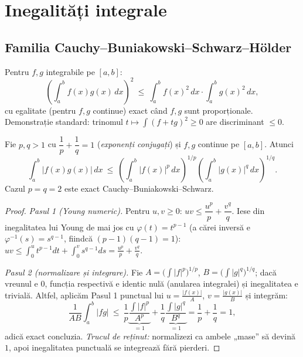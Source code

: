 \section{Inegalități integrale}

\subsection{Familia Cauchy--Buniakowski--Schwarz--Hölder}

\begin{teorema}
Pentru $f,g$ integrabile pe $[a,b]$:
\[
\left(\int_a^b f(x)g(x)\,dx\right)^{2}\ \le\ \int_a^b f(x)^2\,dx\cdot\int_a^b g(x)^2\,dx,
\]
cu egalitate (pentru $f,g$ continue) exact când $f,g$ sunt proporționale. Demonstrație standard: trinomul $t\mapsto\int(f+tg)^2\ge0$ are discriminant $\le0$.
\end{teorema}

\begin{teorema}
Fie $p,q>1$ cu $\dfrac1p+\dfrac1q=1$ (\emph{exponenți conjugați}) și $f,g$ continue pe $[a,b]$. Atunci
\[
\int_a^b|f(x)g(x)|\,dx\ \le\ \left(\int_a^b|f(x)|^p\,dx\right)^{1/p}\left(\int_a^b|g(x)|^q\,dx\right)^{1/q}.
\]
Cazul $p=q=2$ este exact Cauchy--Buniakowski--Schwarz.
\end{teorema}
\begin{proof}
\emph{Pasul 1 (Young numeric).} Pentru $u,v\ge0$: $uv\le\dfrac{u^p}{p}+\dfrac{v^q}{q}$. Iese din inegalitatea lui Young de mai jos cu $\varphi(t)=t^{p-1}$ (a cărei inversă e $\varphi^{-1}(s)=s^{q-1}$, fiindcă $(p-1)(q-1)=1$): $uv\le\int_0^u t^{p-1}dt+\int_0^v s^{q-1}ds=\frac{u^p}p+\frac{v^q}q$.

\emph{Pasul 2 (normalizare și integrare).} Fie $A=\big(\int|f|^p\big)^{1/p}$, $B=\big(\int|g|^q\big)^{1/q}$; dacă vreunul e $0$, funcția respectivă e identic nulă (anularea integralei) și inegalitatea e trivială. Altfel, aplicăm Pasul 1 punctual lui $u=\frac{|f(x)|}{A}$, $v=\frac{|g(x)|}{B}$ și integrăm:
\[
\frac{1}{AB}\int_a^b|fg|\ \le\ \frac{1}{p}\underbrace{\frac{\int|f|^p}{A^p}}_{=1}+\frac{1}{q}\underbrace{\frac{\int|g|^q}{B^q}}_{=1}=\frac1p+\frac1q=1,
\]
adică exact concluzia. \emph{Trucul de reținut:} normalizezi ca ambele „mase'' să devină $1$, apoi inegalitatea punctuală se integrează fără pierderi.
\end{proof}

